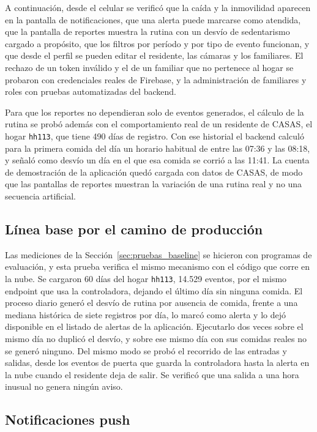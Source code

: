 A continuación, desde el celular se verificó que la caída y la inmovilidad aparecen en la pantalla de notificaciones, que una alerta puede marcarse como atendida, que la pantalla de reportes muestra la rutina con un desvío de sedentarismo cargado a propósito, que los filtros por período y por tipo de evento funcionan, y que desde el perfil se pueden editar el residente, las cámaras y los familiares.
El rechazo de un token inválido y el de un familiar que no pertenece al hogar se probaron con credenciales reales de Firebase, y la administración de familiares y roles con pruebas automatizadas del backend.

Para que los reportes no dependieran solo de eventos generados, el cálculo de la rutina se probó además con el comportamiento real de un residente de CASAS, el hogar \texttt{hh113}, que tiene 490 días de registro.
Con ese historial el backend calculó para la primera comida del día un horario habitual de entre las 07:36 y las 08:18, y señaló como desvío un día en el que esa comida se corrió a las 11:41.
La cuenta de demostración de la aplicación quedó cargada con datos de CASAS, de modo que las pantallas de reportes muestran la variación de una rutina real y no una secuencia artificial.

\subsection{Línea base por el camino de producción}

Las mediciones de la Sección~\ref{sec:pruebas_baseline} se hicieron con programas de evaluación, y esta prueba verifica el mismo mecanismo con el código que corre en la nube.
Se cargaron 60 días del hogar \texttt{hh113}, 14.529 eventos, por el mismo endpoint que usa la controladora, dejando el último día sin ninguna comida.
El proceso diario generó el desvío de rutina por ausencia de comida, frente a una mediana histórica de siete registros por día, lo marcó como alerta y lo dejó disponible en el listado de alertas de la aplicación.
Ejecutarlo dos veces sobre el mismo día no duplicó el desvío, y sobre ese mismo día con sus comidas reales no se generó ninguno.
Del mismo modo se probó el recorrido de las entradas y salidas, desde los eventos de puerta que guarda la controladora hasta la alerta en la nube cuando el residente deja de salir.
Se verificó que una salida a una hora inusual no genera ningún aviso.

\subsection{Notificaciones push}

